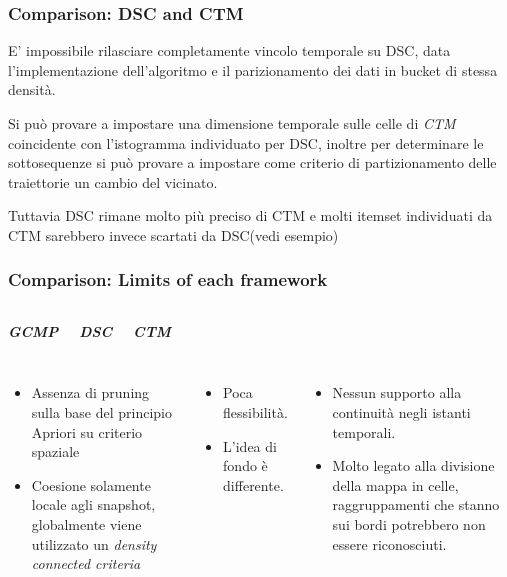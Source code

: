 \documentclass{beamer}
\begin{document}
\begin{frame}
	\frametitle{Comparison: DSC and CTM }
E' impossibile rilasciare completamente vincolo temporale su DSC, data l'implementazione dell'algoritmo e il parizionamento dei dati in bucket di stessa densità.

Si può provare a impostare una dimensione temporale sulle celle di \textit{CTM} coincidente con l'istogramma individuato per DSC, inoltre per determinare le sottosequenze si può provare a impostare come criterio di partizionamento delle traiettorie un cambio del vicinato.

Tuttavia DSC rimane molto più preciso di CTM e molti itemset individuati da CTM sarebbero invece scartati da DSC(vedi esempio) 
\end{frame}

\begin{frame}
	\frametitle{Comparison: Limits of each framework}
	\begin{columns}
		
		\begin{center}
			\textbf{\textit{\huge{GCMP}}}
			
		\end{center}
		
		\begin{center}
			\textbf{\textit{\huge{DSC}}}
			
		\end{center}
		
		\begin{center}
			\textbf{\textit{\huge{CTM}}}
			
		\end{center}
	\end{columns}
	\begin{columns}
		
		\column{.3\columnwidth}
		
\begin{itemize}
	\item Assenza di pruning sulla base del principio Apriori su criterio spaziale
	\item Coesione solamente locale agli snapshot, globalmente viene utilizzato
	un \textit{density connected criteria}
\end{itemize}
		
		
		\column{.3\textwidth}
\begin{itemize}
	\item Poca flessibilità.
	\item L'idea di fondo è differente.
\end{itemize}

		
		\column{.3\textwidth}
\begin{itemize}
	\item Nessun supporto alla continuità negli istanti temporali.
	\item Molto legato alla divisione della mappa in celle, raggruppamenti che stanno sui bordi potrebbero non essere riconosciuti.
\end{itemize}
	\end{columns}
\end{frame}     
\end{document}
